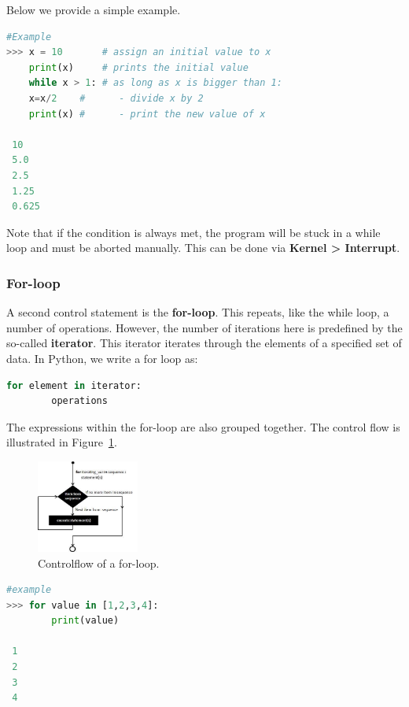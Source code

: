 Below we provide a simple example.

\begin{lstlisting}[language=Python]
#Example 
>>> x = 10       # assign an initial value to x
    print(x)     # prints the initial value
    while x > 1: # as long as x is bigger than 1:
   	x=x/2    #      - divide x by 2
   	print(x) #      - print the new value of x
   	
 10
 5.0
 2.5
 1.25
 0.625
\end{lstlisting}

Note that if the condition is always met, the program will be stuck in a while loop and must be aborted manually. This can be done via \textbf{Kernel > Interrupt}.

\subsubsection{For-loop}

A second control statement is the \textbf{for-loop}. This repeats, like the while loop, a number of operations. However, the number of iterations here is predefined by the so-called \textbf{iterator}. This iterator iterates through the elements of a specified set of data. In Python, we write a for loop as:

\begin{lstlisting}[language=Python]
	for element in iterator:
	    operations 
\end{lstlisting}

The expressions within the for-loop are also grouped together. The control flow is illustrated in Figure~\ref{fig_python_2}.

\begin{figure}[H]
	\begin{center}
		\includegraphics[width=0.3\textwidth]{fig_python_2}
		\caption{Controlflow of a for-loop.}
		\label{fig_python_2}
	\end{center}
\end{figure}

\begin{lstlisting}[language=Python]
#example
>>> for value in [1,2,3,4]:
        print(value)

 1
 2
 3
 4
\end{lstlisting}


